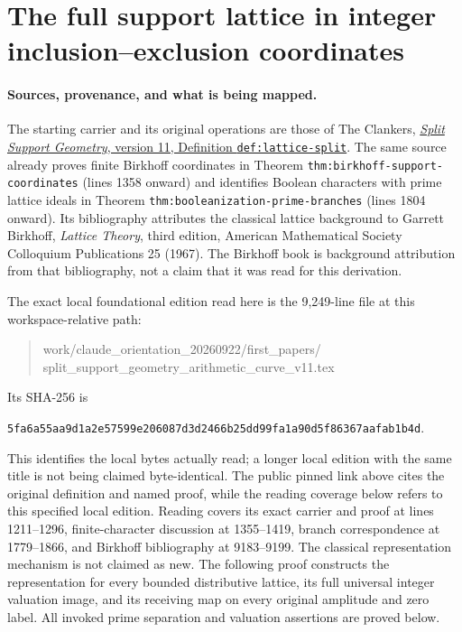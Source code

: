 \section{The full support lattice in integer inclusion--exclusion coordinates}
\label{sec:full-support-inclusion-exclusion}

\paragraph{Sources, provenance, and what is being mapped.}
The starting carrier and its original operations are those of
The Clankers,
\href{https://github.com/KokunoYumeto/zeta-function-research-reader/blob/a2851f9eb352e7e4376bc629de86fa4ed9c1c434/workbenches/splitzero-tandem/foundations/split-support-geometry-v11/split_support_geometry_arithmetic_curve_v11.tex#L1226}
{\emph{Split Support Geometry}, version 11, Definition
\texttt{def:lattice-split}}.
The same source already proves finite Birkhoff coordinates in
Theorem \texttt{thm:birkhoff-\allowbreak support-\allowbreak coordinates} (lines 1358 onward)
and identifies Boolean characters with prime lattice ideals in
Theorem \texttt{thm:booleanization-\allowbreak prime-\allowbreak branches} (lines 1804 onward).
Its bibliography attributes the classical lattice background to
Garrett Birkhoff, \emph{Lattice Theory}, third edition,
American Mathematical Society Colloquium Publications 25 (1967).
The Birkhoff book is background attribution from that bibliography,
not a claim that it was read for this derivation.

The exact local foundational edition read here is the 9,249-line file
at this workspace-relative path:
\begin{quote}\small\ttfamily
work/claude\_orientation\_20260922/first\_papers/\\
split\_support\_geometry\_arithmetic\_curve\_v11.tex
\end{quote}
Its SHA-256 is
\begin{center}\small
\nolinkurl{5fa6a55aa9d1a2e57599e206087d3d2466b25dd99fa1a90d5f86367aafab1b4d}.
\end{center}
This identifies the local bytes actually read; a longer local edition
with the same title is not being claimed byte-identical. The public
pinned link above cites the original definition and named proof,
while the reading coverage below refers to this specified local edition.
Reading covers its exact carrier and proof at lines 1211--1296,
finite-character discussion at 1355--1419, branch correspondence at
1779--1866, and Birkhoff bibliography at 9183--9199.
The classical representation mechanism is not claimed as new.
The following proof constructs the representation for every bounded
distributive lattice, its full universal integer valuation image, and
its receiving map on every original amplitude and zero label.
All invoked prime separation and valuation assertions are proved below.

